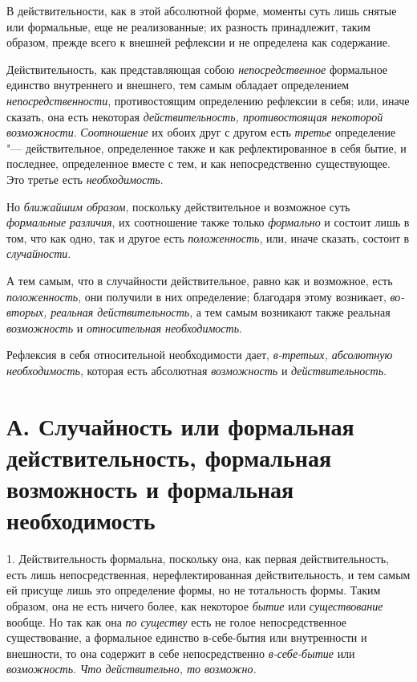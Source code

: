 В действительности, как в этой абсолютной форме, моменты суть лишь снятые
или формальные, еще не реализованные; их разность принадлежит, таким
образом, прежде всего к внешней рефлексии и не определена как содержание.

Действительность, как представляющая собою
{\em непосредственное} формальное единство внутреннего
и внешнего, тем самым обладает определением
{\em непосредственности}, противостоящим определению
рефлексии в себя; или, иначе сказать, она есть некоторая
{\em действительность, противостоящая некоторой
возможности}. {\em Соотношение} их обоих друг с другом
есть {\em третье} определение "--- действительное,
определенное также и как рефлектированное в себя бытие, и последнее,
определенное вместе с тем, и как непосредственно существующее. Это третье
есть {\em необходимость}.

Но {\em ближайшим образом}, поскольку действительное и
возможное суть {\em формальные различия}, их
соотношение также только {\em формально} и состоит лишь
в том, что как одно, так и другое есть
{\em положенность}, или, иначе сказать, состоит в
{\em случайности}.

А тем самым, что в случайности действительное, равно как и возможное, есть
{\em положенность}, они получили в них определение;
благодаря этому возникает, {\em во-вторых, реальная
действительность}, а тем самым возникают также реальная
{\em возможность} и
{\em относительная необходимость}.

Рефлексия в себя относительной необходимости дает,
{\em в-третьих, абсолютную необходимость}, которая есть
абсолютная {\em возможность} и
{\em действительность}.


\section[А. Случайность или формальная действительность, формальная возможность и формальная необходимость]
{А. Случайность или формальная действительность, формальная возможность и формальная необходимость}

1. Действительность формальна, поскольку она,
как первая действительность, есть лишь непосредственная, нерефлектированная
действительность, и тем самым ей присуще лишь это определение формы, но не
тотальность формы. Таким образом, она не есть ничего более, как некоторое
{\em бытие} или {\em существование}
вообще. Но так как она {\em по существу} есть не голое
непосредственное существование, а формальное единство в-себе-бытия или
внутренности и внешности, то она содержит в себе непосредственно
{\em в-себе-бытие} или
{\em возможность}. {\em Что
действительно, то возможно.}

